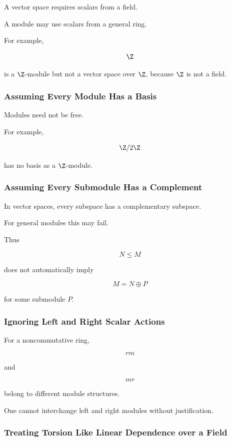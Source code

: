 A vector space requires scalars from a field.

A module may use scalars from a general ring.

For example,

\[ \Z \]

is a \(\Z\)-module but not a vector space over \(\Z\), because \(\Z\) is not
a field.

\subsubsection{Assuming Every Module Has a Basis}

Modules need not be free.

For example,

\[ \Z/2\Z \]

has no basis as a \(\Z\)-module.

\subsubsection{Assuming Every Submodule Has a Complement}

In vector spaces, every subspace has a complementary subspace.

For general modules this may fail.

Thus

\[ N\leq M \]

does not automatically imply

\[ M=N\oplus P \]

for some submodule \(P\).

\subsubsection{Ignoring Left and Right Scalar Actions}

For a noncommutative ring,

\[ rm \]

and

\[ mr \]

belong to different module structures.

One cannot interchange left and right modules without justification.

\subsubsection{Treating Torsion Like Linear Dependence over a Field}

